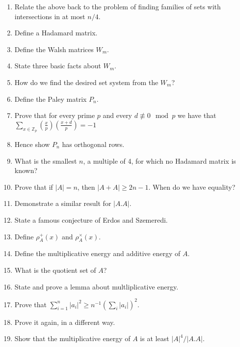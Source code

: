 \documentclass{article}
\newcommand{\bb}[1]{\mathbb{#1}}
\newcommand{\Z}{\bb{Z}}
\begin{document}
\begin{enumerate}
    \item Relate the above back to the problem of finding families of sets with intersections in at most $n/4$.
    \item Define a Hadamard matrix.
    \item Define the Walsh matrices $W_m$.
    \item State three basic facts about $W_m$.
    \item How do we find the desired set system from the $W_m$?
    \item Define the Paley matrix $P_n$.
    \item Prove that for every prime $p$ and every $d\not\equiv 0 \mod p$ we have that $\sum_{x\in\Z_p} \left( \frac{x}{p}\right) \left(\frac{x+d}{p}\right) = -1$
    \item Hence show $P_n$ has orthogonal rows.
    \item What is the smallest $n$, a multiple of 4, for which no Hadamard matrix is known?
    \item Prove that if $|A| = n$, then $|A+A| \ge 2n-1$. When do we have equality?
    \item Demonstrate a similar result for $|A.A|$.
    \item State a famous conjecture of Erdos and Szemeredi.
    \item Define $\rho_A^+(x)$ and $\rho_A^\times(x)$.
    \item Define the multiplicative energy and additive energy of $A$.
    \item What is the quotient set of $A$?
    \item State and prove a lemma about multliplicative energy.
    \item Prove that $\sum_{i=1}^{n} |a_i|^2\ge n^{-1}(\sum_i|a_i|)^2$.
    \item Prove it again, in a different way.
    \item Show that the multiplicative energy of $A$ is at least $|A|^4/|A.A|$.
\end{enumerate}
\end{document}
